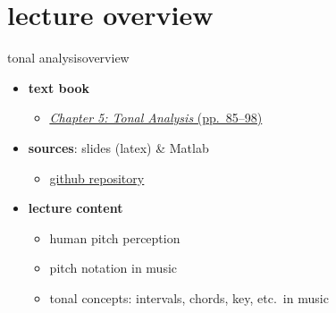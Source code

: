 

\subtitle{Part 6.1: Tonal Analysis Introduction}


	

    \section[overview]{lecture overview}
        \begin{frame}{tonal analysis}{overview}
            \begin{itemize}
                \item   \textbf{text book}  
                    \begin{itemize}
                        \item   \href{http://ieeexplore.ieee.org/xpl/articleDetails.jsp?tp=&arnumber=6331122&}{\underline{\textit{Chapter 5: Tonal Analysis} (pp.~85--98)}}
                    \end{itemize}
                \item   \textbf{sources}: slides (latex) \& Matlab  
                    \begin{itemize}
                        \item   \href{https://github.com/alexanderlerch/ACA-Slides}{\underline{github repository}}
                    \end{itemize}
                \bigskip
                \item<2->   \textbf{lecture content}
                    \begin{itemize}
                        \item<2->   human pitch perception
                        \item<3->   pitch notation in music
                        \item<4->   tonal concepts: intervals, chords, key, etc.\ in music
                    \end{itemize}
            \end{itemize}
        \end{frame}

